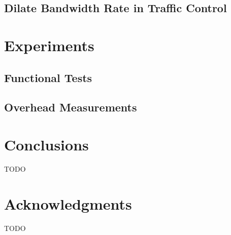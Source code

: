 \documentclass{acm_proc_article-sp}
\begin{document}
\subsection{Dilate Bandwidth Rate in Traffic Control}

\section{Experiments}
\subsection{Functional Tests}
\subsection{Overhead Measurements}

\section{Conclusions}
TODO

\section{Acknowledgments}
TODO
%


%
%
\balancecolumns
\end{document}
